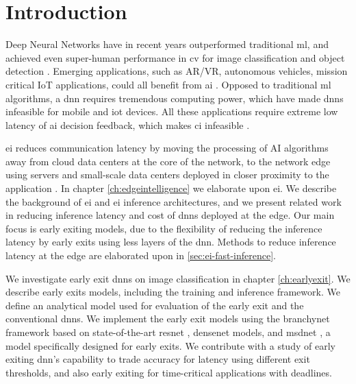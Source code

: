 \hypertarget{introduction}{%
\chapter{Introduction}\label{ch:introduction}}

Deep Neural Networks have in recent years outperformed traditional \gls{ml}, and achieved even super-human performance in \gls{cv} for image classification and object detection \cite{russakovsky_imagenet_2015}. Emerging applications, such as AR/VR, autonomous vehicles, mission critical IoT applications, could all benefit from \gls{ai} \cite{pettey_immersive_2018}. Opposed to traditional \gls{ml} algorithms, a \gls{dnn} requires tremendous computing power, which have made \gls{dnn}s infeasible for mobile and \gls{iot} devices. All these applications require extreme low latency of \gls{ai} decision feedback, which makes \gls{ci} infeasible \cite{zhou_edge_2019}. 

\acrlong{ei} reduces communication latency by moving the processing of AI algorithms away from cloud data centers at the core of the network, to the network edge using servers and small-scale data centers deployed in closer proximity to the application \cite{shi_edge_2016}. In chapter \ref{ch:edgeintelligence} we elaborate upon \gls{ei}. We describe the background of \gls{ei} and \gls{ei} inference architectures, and we present related work in reducing inference latency and cost of \gls{dnn}s deployed at the edge. Our main focus is early exiting models, due to the flexibility of reducing the inference latency by early exits using less layers of the \gls{dnn}. Methods to reduce inference latency at the edge are elaborated upon in \ref{sec:ei-fast-inference}. 

We investigate early exit \gls{dnn}s on image classification in chapter \ref{ch:earlyexit}. We describe early exits models, including the training and inference framework. We define an analytical model used for evaluation of the early exit and the conventional \gls{dnn}s. We implement the early exit models using the \gls{branchynet} framework \cite{teerapittayanon_branchynet:_2016} based on state-of-the-art \gls{resnet} \cite{he_deep_2015}, \gls{densenet} \cite{huang_densely_2016} models, and \gls{msdnet} \cite{huang_multi-scale_2017}, a model specifically designed for early exits. We contribute with a study of early exiting \gls{dnn}'s capability to trade accuracy for latency using different exit thresholds, and also early exiting for time-critical applications with deadlines.

